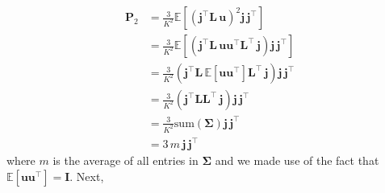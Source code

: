 \begin{align}
    \mathbf{P}_2 & = \frac{3}{K^2}\mathbb{E}\left[ \left(\mathbf{j}^\top \mathbf{L} \, \mathbf{u}\right)^2 \mathbf{j} \, \mathbf{j}^\top \right]
    \nonumber                                                                                                                                                                                   \\
                 & = \frac{3}{K^2}\mathbb{E}\left[\left(\mathbf{j}^\top \mathbf{L} \,  \mathbf{u} \mathbf{u}^\top  \mathbf{L}^\top \, \mathbf{j} \right)  \mathbf{j} \, \mathbf{j}^\top \right]
    \nonumber                                                                                                                                                                                   \\
                 & = \frac{3}{K^2}\left(\mathbf{j}^\top \mathbf{L} \, \mathbb{E}\left[ \mathbf{u} \mathbf{u}^\top \right] \mathbf{L}^\top \, \mathbf{j} \right)  \mathbf{j} \, \mathbf{j}^\top
    \nonumber                                                                                                                                                                                   \\
                 & = \frac{3}{K^2}\left(\mathbf{j}^\top \mathbf{L} \mathbf{L}^\top \, \mathbf{j} \right)  \mathbf{j} \, \mathbf{j}^\top
    \nonumber                                                                                                                                                                                   \\
                 & = \frac{3}{K^2}\mathrm{sum}(\mathbf{\Sigma}) \mathbf{j} \, \mathbf{j}^\top
    \nonumber                                                                                                                                                                                   \\
                 & = 3 \, m \, \mathbf{j} \, \mathbf{j}^\top
\end{align}
%
where $m$ is the average of all entries in $\pmb{\Sigma}$ and
we made use of the fact that $\mathbb{E}\left[ \mathbf{u} \mathbf{u}^\top\right] = \mathbf{I}$.
%
Next,
%
